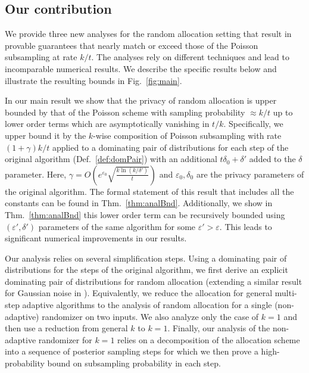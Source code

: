 \documentclass{article}
\newcommand{\Arxiv}[1]{}
\newcommand{\mainThmAsym}{thm:analBnd}
\newcommand{\mainThmRec}{thm:analBnd}
\newcommand{\Arxiv}[1]{#1}
\newcommand{\mainThmAsym}{thm:asymBnd}
\newcommand{\mainThmRec}{thm:recBnd}
\theoremstyle{plain}
\theoremstyle{definition}
\newcommand{\eps}{\varepsilon}
\begin{document}
\subsection{Our contribution}
We provide three new analyses for the random allocation setting that result in provable guarantees that nearly match or exceed those of the Poisson subsampling at rate $k/t$. The analyses rely on different techniques and lead to incomparable numerical results. We describe the specific results below and illustrate the resulting bounds in Fig.~\ref{fig:main}. 

In our main result we show that the privacy of random allocation is upper bounded by that of the Poisson scheme with sampling probability $\approx k/t$ up to lower order terms which are asymptotically vanishing in $t/k$. Specifically, we upper bound it by the $k$-wise composition of Poisson subsampling with rate $(1+\gamma) k/t$ applied to a dominating pair of distributions for each step of the original algorithm (Def.~\ref{def:domPair})  with an additional $t \delta_0 + \delta'$ added to the $\delta$ parameter. Here,  $\gamma=O\left(e^{\eps_0} \sqrt{\frac{k \ln(k/\delta')}{t}}\right)$ and $\eps_0,\delta_0$ are the privacy parameters of the original algorithm. The formal statement of this result that includes all the constants can be found in Thm.~\ref{\mainThmAsym}. Additionally, we show in Thm.~\ref{\mainThmRec} this lower order term can be recursively bounded using $(\eps',\delta')$ parameters of the same algorithm for some $\eps'>\eps$. This leads to significant numerical improvements in our results.

\Arxiv{
We note that our result scale with $\eps_0,\delta_0$ parameters of the original algorithm. This may appear to lead to the same overheads as the results based on full shuffling analysis. However in our case these parameters only affect the lower order term, whereas for shuffling they are used as the basis for privacy amplification (Lemma \ref{lem:GaussAsymBnd}).
}

Our analysis relies on several simplification steps. Using a dominating pair of distributions for the steps of the original algorithm, we first derive an explicit dominating pair of distributions for random allocation (extending a similar result for Gaussian noise in \citep{CGHLKKMSZ24,CCGHST25}). Equivalently, we reduce the allocation for general multi-step adaptive algorithms to the analysis of random allocation for a single (non-adaptive) randomizer on two inputs.
We also analyze only the case of $k=1$ and then use a reduction from general $k$ to $k=1$.
Finally, our analysis of the non-adaptive randomizer for $k=1$ relies on a decomposition of the allocation scheme into a sequence of posterior sampling steps for which we then prove a high-probability bound on subsampling probability in each step.
\end{document}

